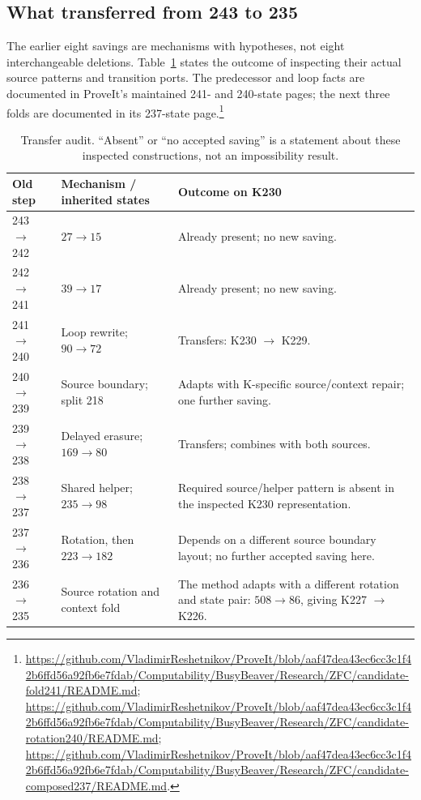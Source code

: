 \documentclass[11pt,a4paper]{article}
\begin{document}
\subsection{What transferred from 243 to 235}

The earlier eight savings are mechanisms with hypotheses, not eight
interchangeable deletions. Table~\ref{tab:transfer} states the outcome
of inspecting their actual source patterns and transition ports.
The predecessor and loop facts are documented in ProveIt's maintained
241- and 240-state pages; the next three folds are documented in its
237-state page.\footnote{
\url{https://github.com/VladimirReshetnikov/ProveIt/blob/aaf47dea43ec6cc3c1f42b6ffd56a92fb6e7fdab/Computability/BusyBeaver/Research/ZFC/candidate-fold241/README.md};
\url{https://github.com/VladimirReshetnikov/ProveIt/blob/aaf47dea43ec6cc3c1f42b6ffd56a92fb6e7fdab/Computability/BusyBeaver/Research/ZFC/candidate-rotation240/README.md};
\url{https://github.com/VladimirReshetnikov/ProveIt/blob/aaf47dea43ec6cc3c1f42b6ffd56a92fb6e7fdab/Computability/BusyBeaver/Research/ZFC/candidate-composed237/README.md}.}

\begin{table}[htbp]
\small
\begin{tabularx}{\textwidth}{@{}l l X@{}}
\toprule
Old step & Mechanism / inherited states & Outcome on K230 \\
\midrule
243 $\to$ 242 & $27\to15$ & Already present; no new saving.\\
242 $\to$ 241 & $39\to17$ & Already present; no new saving.\\
241 $\to$ 240 & Loop rewrite; $90\to72$ & Transfers: K230 $\to$ K229.\\
240 $\to$ 239 & Source boundary; split 218 & Adapts with K-specific source/context repair; one further saving.\\
239 $\to$ 238 & Delayed erasure; $169\to80$ & Transfers; combines with both sources.\\
238 $\to$ 237 & Shared helper; $235\to98$ & Required source/helper pattern is absent in the inspected K230 representation.\\
237 $\to$ 236 & Rotation, then $223\to182$ & Depends on a different source boundary layout; no further accepted saving here.\\
236 $\to$ 235 & Source rotation and context fold & The method adapts with a different rotation and state pair: $508\to86$, giving K227 $\to$ K226.\\
\bottomrule
\end{tabularx}
\caption{Transfer audit. ``Absent'' or ``no accepted saving'' is a statement
about these inspected constructions, not an impossibility result.}
\label{tab:transfer}
\end{table}
\end{document}
